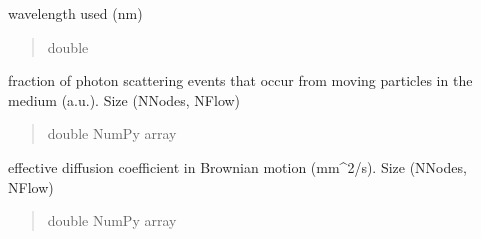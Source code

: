 \documentclass[letterpaper,10pt,english]{sphinxmanual}
\begin{document}
\begin{fulllineitems}
\begin{fulllineitems}
\begin{quote}
\begin{description}
\end{description}\end{quote}

\end{fulllineitems}


\begin{fulllineitems}
\label{\detokenize{_autosummary/nirfasterff.base.dcs_mesh.dcsmesh:nirfasterff.base.dcs_mesh.dcsmesh.wv_DCS}}
\pysigstartsignatures
\pysigline
{}
\pysigstopsignatures
\sphinxAtStartPar
wavelength used (nm)
\begin{quote}\begin{description}
\sphinxAtStartPar
double

\end{description}\end{quote}

\end{fulllineitems}


\begin{fulllineitems}
\label{\detokenize{_autosummary/nirfasterff.base.dcs_mesh.dcsmesh:nirfasterff.base.dcs_mesh.dcsmesh.alpha}}
\pysigstartsignatures
\pysigline
{}
\pysigstopsignatures
\sphinxAtStartPar
fraction of photon scattering events that occur from moving particles in the medium (a.u.). Size (NNodes, NFlow)
\begin{quote}\begin{description}
\sphinxAtStartPar
double NumPy array

\end{description}\end{quote}

\end{fulllineitems}


\begin{fulllineitems}
\label{\detokenize{_autosummary/nirfasterff.base.dcs_mesh.dcsmesh:nirfasterff.base.dcs_mesh.dcsmesh.Db}}
\pysigstartsignatures
\pysigline
{}
\pysigstopsignatures
\sphinxAtStartPar
effective diffusion coefficient in Brownian motion (mm\textasciicircum{}2/s). Size (NNodes, NFlow)
\begin{quote}\begin{description}
\sphinxAtStartPar
double NumPy array


\end{description}
\end{quote}
\end{fulllineitems}
\end{fulllineitems}
\end{document}
